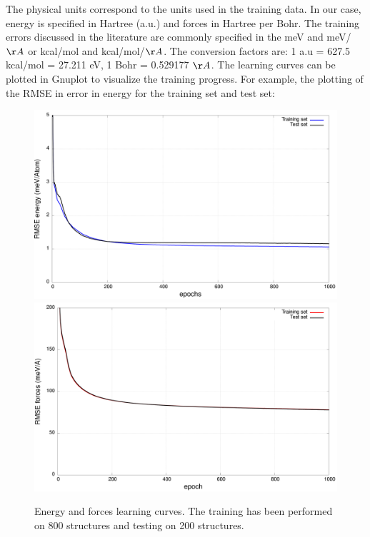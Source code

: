 \documentclass[12pt]{article}
\begin{document}
 The physical units correspond to the units used in the training data. In our case, energy is specified in Hartree (a.u.) and forces in Hartree per Bohr. The training errors discussed in the literature are commonly specified in the meV and meV/$\AA$ or kcal/mol and kcal/mol/$\AA$. The conversion factors are: 1 a.u = 627.5 kcal/mol = 27.211 eV, 1 Bohr = 0.529177 $\AA$. The learning curves can be plotted in Gnuplot to visualize the training progress. For example, the plotting of the RMSE in error in energy for the training set and test set:

\begin{center}
\end{center}

\begin{figure}
    \centering
    \includegraphics[scale=0.2]{latex_files/energy.png}
    \includegraphics[scale=0.2]{latex_files/forces.png}
    \caption{Energy and forces learning curves. The training has been performed on 800 structures and testing on 200 structures.}
    \label{fig:my_label}
\end{figure}
\end{document}
